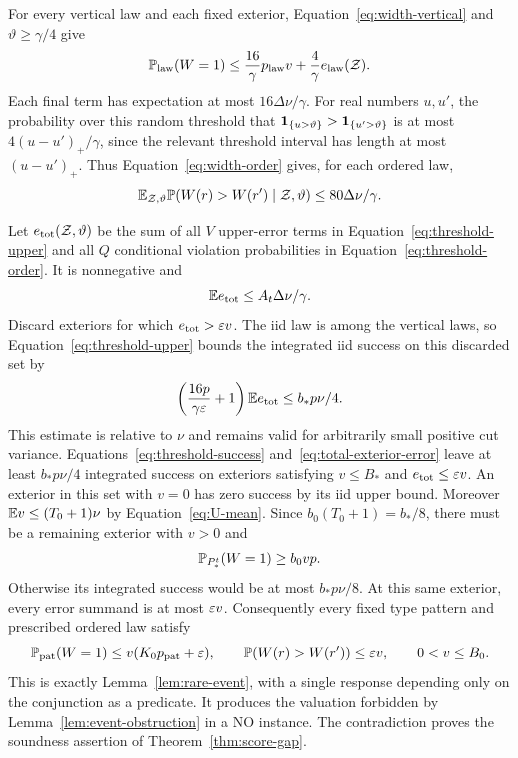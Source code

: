 For every vertical law and each fixed exterior,
Equation~\ref{eq:width-vertical} and $\vartheta\ge\gamma/4$ give
\begin{equation}\label{eq:threshold-upper}
 \mathbb P_{\rm law}(W=1)
 \le \frac{16}{\gamma}p_{\rm law}v
                              +\frac4\gamma e_{\rm law}(\mathcal Z).
\end{equation}
Each final term has expectation at most $16\Delta\nu/\gamma$.
For real numbers $u,u'$, the probability over this random threshold
that $\mathbf 1_{\{u>\vartheta\}}>\mathbf 1_{\{u'>\vartheta\}}$ is at most
$4(u-u')_+/\gamma$, since the relevant threshold interval has length
at most $(u-u')_+$. Thus Equation~\ref{eq:width-order} gives, for each
ordered law,
\begin{equation}\label{eq:threshold-order}
 \mathbb E_{\mathcal Z,\vartheta}\mathbb P(W(r)>W(r')\mid\mathcal Z,\vartheta)
 \le80\Delta\nu/\gamma.
\end{equation}

Let $e_{\rm tot}(\mathcal Z,\vartheta)$ be the sum of all $V$ upper-error
terms in Equation~\ref{eq:threshold-upper} and all $Q$ conditional
violation probabilities in Equation~\ref{eq:threshold-order}. It is
nonnegative and
\begin{equation}\label{eq:total-exterior-error}
 \mathbb E e_{\rm tot}\le A_t\Delta\nu/\gamma.
\end{equation}
Discard exteriors for which $e_{\rm tot}>\varepsilon v$. The iid law is among
the vertical laws, so Equation~\ref{eq:threshold-upper} bounds the
integrated iid success on this discarded set by
\[
 \left(\frac{16p}{\gamma\varepsilon}+1\right)\mathbb E e_{\rm tot}
 \le b_*p\nu/4.
\]
This estimate is relative to $\nu$ and remains valid for arbitrarily
small positive cut variance. Equations~\ref{eq:threshold-success}
and~\ref{eq:total-exterior-error} leave at least $b_*p\nu/4$ integrated
success on exteriors satisfying $v\le B_*$ and
$e_{\rm tot}\le\varepsilon v$. An exterior in this set with $v=0$ has zero
success by its iid upper bound. Moreover $\mathbb E v\le(T_0+1)\nu$ by
Equation~\ref{eq:U-mean}. Since
$b_0(T_0+1)=b_*/8$, there must be a remaining exterior with $v>0$ and
\[
 \mathbb P_{P_*^t}(W=1)\ge b_0vp.
\]
Otherwise its integrated success would be at most $b_*p\nu/8$.
At this same exterior, every error summand is at most $\varepsilon v$.
Consequently every fixed type pattern and prescribed ordered law satisfy
\[
 \mathbb P_{\rm pat}(W=1)\le v(K_0p_{\rm pat}+\varepsilon),\qquad
 \mathbb P(W(r)>W(r'))\le\varepsilon v,
 \qquad 0<v\le B_0.
\]
This is exactly Lemma~\ref{lem:rare-event}, with a single response
depending only on the conjunction as a predicate. It produces the
valuation forbidden by Lemma~\ref{lem:event-obstruction} in a NO
instance. The contradiction proves the soundness assertion of
Theorem~\ref{thm:score-gap}.

